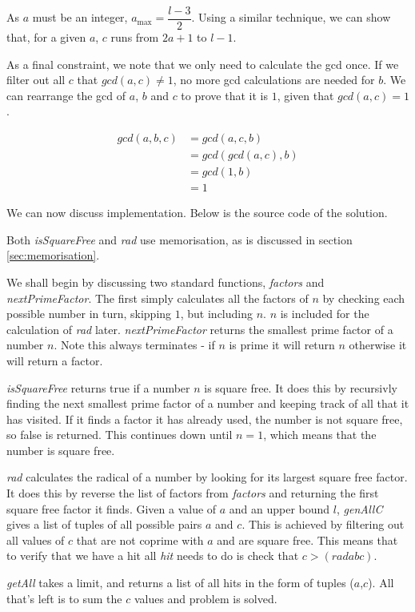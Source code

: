 As $a$ must be an integer, $a_\text{max} = \dfrac{l-3}{2}$. Using a similar technique, we can show that, for a given $a$, $c$ runs from $2a + 1$ to $l - 1$.

As a final constraint, we note that we only need to calculate the gcd once. If we filter out all $c$ that $gcd(a,c) \neq 1$, no more gcd calculations are needed for $b$. We can rearrange the gcd of $a$, $b$ and $c$ to prove that it is $1$, given that $gcd(a,c) = 1$.

\begin{align}
	gcd(a,b,c) &= gcd(a,c,b) \\
	&= gcd( gcd(a,c),b) \\
	&= gcd(1,b) \\
	&= 1
\end{align}

We can now discuss implementation. Below is the source code of the solution.



Both \textit{isSquareFree} and \textit{rad} use memorisation, as is discussed in section \ref{sec:memorisation}.

We shall begin by discussing two standard functions, \textit{factors} and \textit{nextPrimeFactor}. The first simply calculates all the factors of $n$ by checking each possible number in turn, skipping $1$, but including $n$. $n$ is included for the calculation of \textit{rad} later. \textit{nextPrimeFactor} returns the smallest prime factor of a number $n$. Note this always terminates - if $n$ is prime it will return $n$ otherwise it will return a factor.

\textit{isSquareFree} returns true if a number $n$ is square free. It does this by recursivly finding the next smallest prime factor of a number and keeping track of all that it has visited. If it finds a factor it has already used, the number is not square free, so false is returned. This continues down until $n=1$, which means that the number is square free.

\textit{rad} calculates the radical of a number by looking for its largest square free factor. It does this by reverse the list of factors from \textit{factors} and returning the first square free factor it finds. Given a value of $a$ and an upper bound $l$, \textit{genAllC} gives a list of tuples of all possible pairs $a$ and $c$. This is achieved by filtering out all values of $c$ that are not coprime with $a$ and are square free. This means that to verify that we have a hit all \textit{hit} needs to do is check that $c > (rad a b c)$.

\textit{getAll} takes a limit, and returns a list of all hits in the form of tuples ($a$,$c$). All that's left is to sum the $c$ values and problem is solved.
